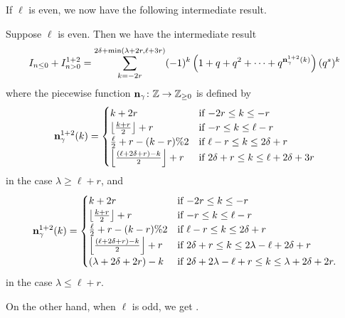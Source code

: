 If $\ell$ is even, we now have the following intermediate result.
\begin{proposition}
  \label{prop:ell_even_half}
  Suppose $\ell$ is even.
  Then we have the intermediate result
  \[
    I_{n \le 0} + I_{n > 0}^{\text{1+2}}
    = \sum_{k = -2r}^{2\delta + \min(\lambda+2r, \ell+3r)}
    (-1)^k \left( 1 + q + q^2 + \dots + q^{\mathbf n^{1+2}_{\gamma}(k)}  \right) (q^s)^k
  \]
  where the piecewise function $\mathbf n_\gamma \colon \mathbb Z \to \mathbb Z_{\ge 0}$ is defined by
  \[
    \mathbf n^{1+2}_\gamma(k) =
    \begin{cases}
      k + 2r & \text{if } {-2r} \le k \le -r \\
      \left\lfloor \frac{k+r}{2} \right\rfloor + r & \text{if }{-r} \le k \le \ell-r \\
      \frac{\ell}{2} + r - (k-r)\%2 & \text{if } \ell - r \le k \le 2\delta + r \\
      \left\lfloor \frac{(\ell+2\delta+r)-k}{2} \right\rfloor + r & \text{if } 2\delta + r \le k \le \ell + 2\delta + 3r
    \end{cases}
  \]
  in the case $\lambda \ge \ell+r$, and
  \[
    \mathbf n^{1+2}_\gamma(k) =
    \begin{cases}
      k + 2r & \text{if } {-2r} \le k \le -r \\
      \left\lfloor \frac{k+r}{2} \right\rfloor + r & \text{if }{-r} \le k \le \ell-r \\
      \frac{\ell}{2} + r - (k-r) \% 2 & \text{if } \ell - r \le k \le 2\delta + r \\
      \left\lfloor \frac{(\ell+2\delta+r)-k}{2} \right\rfloor + r & \text{if } 2\delta + r \le k \le 2\lambda - \ell + 2\delta + r \\
      (\lambda + 2\delta + 2r) - k & \text{if } 2 \delta + 2 \lambda - \ell + r \le k \le \lambda + 2\delta + 2r.
    \end{cases}
  \]
  in the case $\lambda \le \ell+r$.
\end{proposition}

On the other hand, when $\ell$ is odd, we get .

